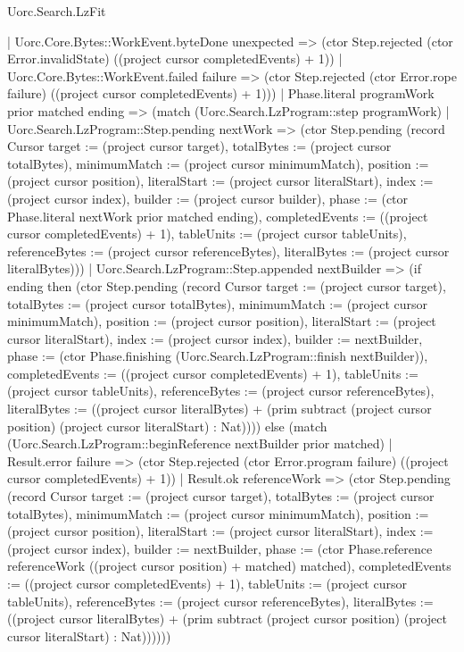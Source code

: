 \begin{lexlean}{Uorc.Search.LzFit}
\begin{semanticmodule}
{      | Uorc.Core.Bytes::WorkEvent.byteDone unexpected => (ctor Step.rejected (ctor Error.invalidState) ((project cursor completedEvents) + 1))
      | Uorc.Core.Bytes::WorkEvent.failed failure => (ctor Step.rejected (ctor Error.rope failure) ((project cursor completedEvents) + 1)))
    | Phase.literal programWork prior matched ending => (match (Uorc.Search.LzProgram::step programWork)
      | Uorc.Search.LzProgram::Step.pending nextWork => (ctor Step.pending (record Cursor {target := (project cursor target), totalBytes := (project cursor totalBytes), minimumMatch := (project cursor minimumMatch), position := (project cursor position), literalStart := (project cursor literalStart), index := (project cursor index), builder := (project cursor builder), phase := (ctor Phase.literal nextWork prior matched ending), completedEvents := ((project cursor completedEvents) + 1), tableUnits := (project cursor tableUnits), referenceBytes := (project cursor referenceBytes), literalBytes := (project cursor literalBytes)}))
      | Uorc.Search.LzProgram::Step.appended nextBuilder => (if ending then (ctor Step.pending (record Cursor {target := (project cursor target), totalBytes := (project cursor totalBytes), minimumMatch := (project cursor minimumMatch), position := (project cursor position), literalStart := (project cursor literalStart), index := (project cursor index), builder := nextBuilder, phase := (ctor Phase.finishing (Uorc.Search.LzProgram::finish nextBuilder)), completedEvents := ((project cursor completedEvents) + 1), tableUnits := (project cursor tableUnits), referenceBytes := (project cursor referenceBytes), literalBytes := ((project cursor literalBytes) + (prim subtract (project cursor position) (project cursor literalStart) : Nat))})) else (match (Uorc.Search.LzProgram::beginReference nextBuilder prior matched)
        | Result.error failure => (ctor Step.rejected (ctor Error.program failure) ((project cursor completedEvents) + 1))
        | Result.ok referenceWork => (ctor Step.pending (record Cursor {target := (project cursor target), totalBytes := (project cursor totalBytes), minimumMatch := (project cursor minimumMatch), position := (project cursor position), literalStart := (project cursor literalStart), index := (project cursor index), builder := nextBuilder, phase := (ctor Phase.reference referenceWork ((project cursor position) + matched) matched), completedEvents := ((project cursor completedEvents) + 1), tableUnits := (project cursor tableUnits), referenceBytes := (project cursor referenceBytes), literalBytes := ((project cursor literalBytes) + (prim subtract (project cursor position) (project cursor literalStart) : Nat))}))))
}
\end{semanticmodule}
\end{lexlean}
